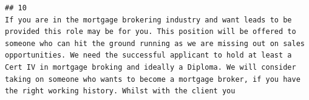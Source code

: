 \documentclass[11pt,a4paper,]{article}
\begin{document}
\begin{verbatim}
## 10                                                                                                                                                                                                                                                                                                                                                                                                                                                                                                                                                                                                                                                                                                                                                                                                                                                                                                                                                                                                                                                                                                                                                                                                                                                                                                                                                                                                                                                                                                                                                                                                                                                                                                                                                                                                                                                                                                                                                                                                                                                                                                                                                                                                                                                                                                                                                                                                                                                                                                                                                                                                                                                                                                                                                                                                                                                                                                                                                                If you are in the mortgage brokering industry and want leads to be provided this role may be for you. This position will be offered to someone who can hit the ground running as we are missing out on sales opportunities. We need the successful applicant to hold at least a Cert IV in mortgage broking and ideally a Diploma. We will consider taking on someone who wants to become a mortgage broker, if you have the right working history. Whilst with the client you 
\end{verbatim}
\end{document}
